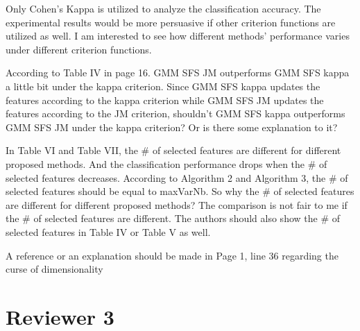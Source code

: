 \documentclass[a4paper,10pt,DIV=16]{scrartcl}
\begin{document}
\begin{revbox}
  Only Cohen’s Kappa is utilized to analyze the classification accuracy. The experimental results would be more persuasive if other criterion functions are utilized as well. I am interested to see how different methods’ performance varies under different criterion functions.
  \begin{resbox}

  \end{resbox}
\end{revbox}

\begin{revbox}
  According to Table IV in page 16. GMM SFS JM outperforms GMM SFS kappa a little bit under the kappa criterion. Since GMM SFS kappa updates the features according to the kappa criterion while GMM SFS JM updates the features according to the JM criterion, shouldn’t GMM SFS kappa outperforms GMM SFS JM under the kappa criterion? Or is there some explanation to it?
  \begin{resbox}

  \end{resbox}
\end{revbox}

\begin{revbox}
  In Table VI and Table VII, the \# of selected features are different for different proposed methods. And the classification performance drops when the \# of selected features decreases. According to Algorithm 2 and Algorithm 3, the \# of selected features should be equal to maxVarNb. So why the \# of selected features are different for different proposed methods? The comparison is not fair to me if the \# of selected features are different. The authors should also show the \# of selected features in Table IV or Table V as well.
  \begin{resbox}

  \end{resbox}
\end{revbox}

\begin{revbox}
  A reference or an explanation should be made in Page 1, line 36 regarding the curse of dimensionality
  \begin{resbox}

  \end{resbox}
\end{revbox}

\section{Reviewer 3}
\end{document}
